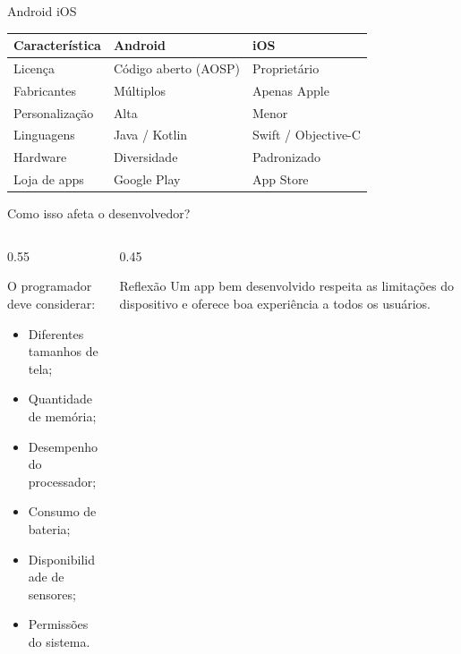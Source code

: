 \documentclass[aspectratio=169]{beamer}
\begin{document}
\begin{frame}{Android \texttimes{} iOS}
    \begin{center}
        \begin{tabular}{lll}
            \toprule
            \textbf{Característica}     & \textbf{Android}          & \textbf{iOS} \\
            \midrule
            Licença                    & Código aberto (AOSP)      & Proprietário \\
            Fabricantes                & Múltiplos                 & Apenas Apple \\
            Personalização             & Alta                      & Menor \\
            Linguagens                 & Java / Kotlin             & Swift / Objective-C \\
            Hardware                   & Diversidade               & Padronizado \\
            Loja de apps               & Google Play               & App Store \\
            \bottomrule
        \end{tabular}
    \end{center}
\end{frame}

\begin{frame}{Como isso afeta o desenvolvedor?}
    \begin{columns}[T]
        \begin{column}{0.55\textwidth}
            \begin{block}{O programador deve considerar:}
                \begin{itemize}
                    \item Diferentes tamanhos de tela;
                    \item Quantidade de memória;
                    \item Desempenho do processador;
                    \item Consumo de bateria;
                    \item Disponibilidade de sensores;
                    \item Permissões do sistema.
                \end{itemize}
            \end{block}
        \end{column}
        \begin{column}{0.45\textwidth}
            \begin{alertblock}{Reflexão}
                Um app bem desenvolvido respeita as limitações do dispositivo e oferece boa experiência a todos os usuários.
            \end{alertblock}
        \end{column}
    \end{columns}
\end{frame}
\end{document}
